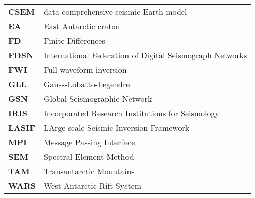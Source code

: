 \begin{tabular}{ll}
\textbf{CSEM  } &data-comprehensive seismic Earth model  \\
\textbf{EA    } &East Antarctic craton  \\
\textbf{FD    } &Finite Differences  \\
\textbf{FDSN  } &International Federation of Digital Seismograph Networks  \\
\textbf{FWI   } &Full waveform inversion  \\
\textbf{GLL   } &Gauss-Lobatto-Legendre  \\
\textbf{GSN   } &Global Seismographic Network  \\
\textbf{IRIS  } &Incorporated Research Institutions for Seismology  \\
\textbf{LASIF } &LArge-scale Seismic Inversion Framework  \\
\textbf{MPI   } &Message Passing Interface  \\
\textbf{SEM   } &Spectral Element Method  \\
\textbf{TAM   } &Transantarctic Mountains  \\
\textbf{WARS  } &West Antarctic Rift System  
\end{tabular}




